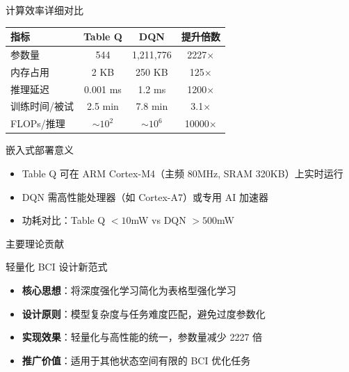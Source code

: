 {\begin{frame}{计算效率详细对比}
    \begin{table}[h]
        \centering
        \renewcommand{\arraystretch}{1.3}
        \begin{tabular}{lccc}
            \hline
            \textbf{指标} & \textbf{Table Q} & \textbf{DQN} & \textbf{提升倍数} \\
            \hline
            参数量 & 544 & 1,211,776 & 2227$\times$ \\
            内存占用 & 2 KB & 250 KB & 125$\times$ \\
            推理延迟 & 0.001 ms & 1.2 ms & 1200$\times$ \\
            训练时间/被试 & 2.5 min & 7.8 min & 3.1$\times$ \\
            FLOPs/推理 & $\sim 10^2$ & $\sim 10^6$ & 10000$\times$ \\
            \hline
        \end{tabular}
    \end{table}
    
    \vspace{0.3cm}
    \begin{block}{嵌入式部署意义}
        \begin{itemize}
            \item Table Q 可在 ARM Cortex-M4（主频 80MHz, SRAM 320KB）上实时运行
            \item DQN 需高性能处理器（如 Cortex-A7）或专用 AI 加速器
            \item 功耗对比：Table Q $< 10$mW vs DQN $> 500$mW
        \end{itemize}
    \end{block}
\end{frame}

\begin{frame}{主要理论贡献}
    \begin{block}{轻量化 BCI 设计新范式}
        \begin{itemize}
            \item \textbf{核心思想}：将深度强化学习简化为表格型强化学习
            \item \textbf{设计原则}：模型复杂度与任务难度匹配，避免过度参数化
            \item \textbf{实现效果}：轻量化与高性能的统一，参数量减少 2227 倍
            \item \textbf{推广价值}：适用于其他状态空间有限的 BCI 优化任务
        \end{itemize}
    \end{block}


\end{frame}}
